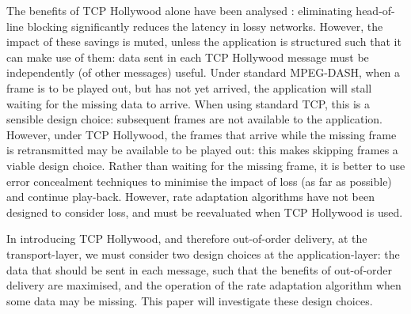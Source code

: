 The benefits of TCP Hollywood alone have been analysed
\cite{mcquistin2016tcp, mcquistin2016tcp2}: eliminating head-of-line blocking significantly
reduces the latency in lossy networks. However, the impact of these savings is muted,
unless the application is structured such that it can make use of them: data sent in each
TCP Hollywood message must be independently (of other messages) useful. Under standard
MPEG-DASH, when a frame is to be played out, but has not yet arrived, the application
will stall waiting for the missing data to arrive. When using standard TCP, this is a
sensible design choice: subsequent frames are not available to the application. However,
under TCP Hollywood, the frames that arrive while the missing frame is retransmitted
may be available to be played out: this makes skipping frames a viable design choice.
Rather than waiting for the missing frame, it is better to use error concealment
techniques to minimise the impact of loss (as far as possible) and continue play-back.
However, rate adaptation algorithms have not been designed to consider loss, and must be
reevaluated when TCP Hollywood is used.

In introducing TCP Hollywood, and therefore out-of-order delivery, at the transport-layer,
we must consider two design choices at the application-layer: the data that should be
sent in each message, such that the benefits of out-of-order delivery are maximised,
and the operation of the rate adaptation algorithm when some data may be missing. This
paper will investigate these design choices.